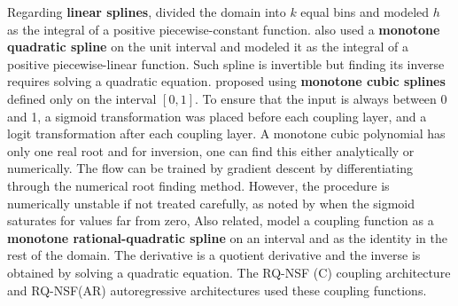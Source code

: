 Regarding \textbf{linear splines}, 
\cite{muller2019neural} divided the domain into $k$ equal bins and modeled $h$ as the integral of a positive piecewise-constant function. 
\cite{muller2019neural} also used a \textbf{monotone quadratic spline} on the unit interval and modeled it as the integral of a positive piecewise-linear function. Such spline is invertible but finding its inverse requires solving a quadratic equation.
\cite{durkan2019cubic} proposed using \textbf{monotone cubic splines} defined only on the interval $[0,1]$. To ensure that the input is always between 0 and 1, a sigmoid transformation was placed before each coupling layer, and a logit transformation after each coupling layer.
A monotone cubic polynomial has only one real root and for inversion, one can find this either analytically or numerically. 
The flow can be trained by gradient descent by differentiating through the numerical root finding method. However, the procedure is numerically unstable if not treated carefully, as noted by \cite{durkan2019neural} when the sigmoid saturates for values far from zero, %
Also related, 
\cite{durkan2019neural} model a coupling function as a \textbf{monotone rational-quadratic spline} on an interval and as the identity in the rest of the domain.
The derivative is a quotient derivative and the inverse is obtained by solving a quadratic equation. The RQ-NSF (C) coupling architecture and RQ-NSF(AR) autoregressive architectures used these coupling functions.


